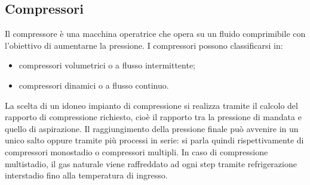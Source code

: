 \subsection{Compressori}
Il compressore è una macchina operatrice che opera su un fluido comprimibile con l'obiettivo di aumentarne la pressione. I compressori possono classificarsi in:
\begin{itemize}
    \item compressori volumetrici o a flusso intermittente;
    \item compressori dinamici o a flusso continuo.
\end{itemize}
 La scelta di un idoneo impianto di compressione si realizza tramite il calcolo del rapporto di compressione richiesto, cioè il rapporto tra la pressione di mandata e quello di aspirazione. Il raggiungimento della pressione finale può avvenire in un unico salto oppure tramite più processi in serie: si parla quindi rispettivamente di compressori monostadio o compressori multipli. In caso di compressione multistadio, il gas naturale viene raffreddato ad ogni step tramite refrigerazione interstadio fino alla temperatura di ingresso.
